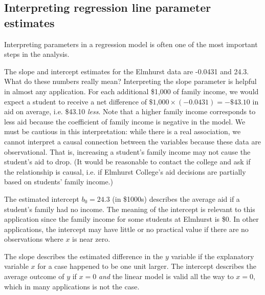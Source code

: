 \textC{\newpage}


\subsection{Interpreting regression line parameter estimates}


Interpreting parameters in a regression model is often one of the most important steps in the analysis.

\begin{example}{The slope and intercept estimates for the Elmhurst data are -0.0431 and 24.3. What do these numbers really mean?}
Interpreting the slope parameter is helpful in almost any application. For each additional \$1,000 of family income, we would expect a student to receive a net difference of $\$\text{1,000}\times (-0.0431) = -\$43.10$ in aid on average, i.e. \$43.10 \emph{less}. Note that a higher family income corresponds to less aid because the coefficient of family income is negative in the model. We must be cautious in this interpretation: while there is a real association, we cannot interpret a causal connection between the variables because these data are observational. That is, increasing a student's family income may not cause the student's aid to drop. (It would be reasonable to contact the college and ask if the relationship is causal, i.e. if Elmhurst College's aid decisions are partially based on students' family income.)

The estimated intercept $b_0=24.3$ (in \$1000s) describes the average aid if a student's family had no income. The meaning of the intercept is relevant to this application since the family income for some students at Elmhurst is \$0. In other applications, the intercept may have little or no practical value if there are no observations where $x$ is near zero.
\end{example}

\begin{termBox}{
The slope describes the estimated difference in the $y$ variable if the explanatory variable $x$ for a case happened to be one unit larger. The intercept describes the average outcome of $y$ if $x=0$ \emph{and} the linear model is valid all the way to $x=0$, which in many applications is not the case.}
\end{termBox}

